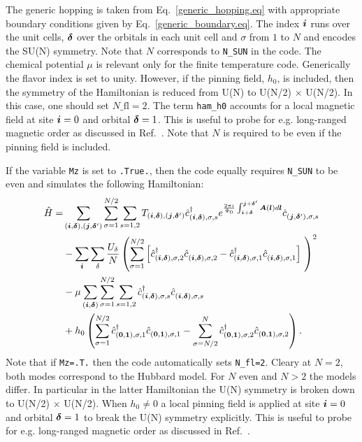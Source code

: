 The generic hopping is taken from Eq.~\eqref{generic_hopping.eq}   with appropriate boundary conditions given by Eq.~\eqref{generic_boundary.eq}.  The index $\boldsymbol{i}$ runs over the unit cells, $\boldsymbol{\delta}$ over the orbitals in each unit cell and $\sigma$  from $1$ to $N$  and encodes the SU(N) symmetry.    Note that  $N$ corresponds to \texttt{N\_SUN}  in the code.  The chemical potential $\mu$ is relevant only for the finite temperature code. Generically the flavor index is set to  unity.  However, if the pinning field, $h_0$, is  included, then the symmetry of the Hamiltonian is reduced from U(N) to U(N/2) $\times$ U(N/2). In this case, one 
should set $N\_{\mathrm{fl}}=2$. 
The term \texttt{ham\_h0}  accounts for a  local magnetic field at site $\boldsymbol{i}=0$ and orbital $\boldsymbol{\delta}=1$.
This is useful to probe for e.g. long-ranged magnetic order as discussed in Ref.~\cite{Assaad13}.  Note that $N$ is required to be even if the pinning field is included. 


If the variable \texttt{Mz} is set to \texttt{.True.}, then the code equally requires  \texttt{N\_SUN}  to be even and simulates the following Hamiltonian: 
\begin{align}
\hat{H} =& \sum_{(\ve{i},\ve{\delta}), (\ve{j},\ve{\delta}')}  \sum_{\sigma =1}^{N/2}  \sum_{s=1,2} T_{(\ve{i},\ve{\delta}), (\ve{j},\ve{\delta}')}    \hat{c}^{\dagger}_{(\ve{i},\ve{\delta}), \sigma,s }   e^{\frac{2 \pi i}{\Phi_0} \int_{\ve{i} + \ve{\delta}}^{\ve{j} + \ve{\delta}'}  
     \vec{A}(\ve{l})  d \ve{l}} \hat{c}^{}_{(\ve{j},\ve{\delta}'),\sigma,s}     \nonumber   \\
    &- \sum_{\vec{i}} \sum_{\delta}   \frac{U_\delta}{N} \left(\sum_{\sigma=1}^{N/2}  \left[   \hat{c}^{\dagger}_{(\vec{i},\ve{\delta}),\sigma, 2} 
    \hat{c}^{\phantom\dagger}_{(\vec{i}, \ve{\delta}),\sigma,2 }  -  \hat{c}^{\dagger}_{(\vec{i},\ve{\delta}),\sigma, 1} 
    \hat{c}^{\phantom\dagger}_{(\vec{i}, \ve{\delta}),\sigma,1} \right] \right)^2  \nonumber \\
    & - \mu \sum_{(\ve{i},\ve{\delta})}  \sum_{\sigma =1}^{N/2}  \sum_{s=1,2}\hat{c}^{\dagger}_{(\vec{i},\ve{\delta}),\sigma, s} \hat{c}^{\phantom\dagger}_{(\vec{i},\ve{\delta}),\sigma, s} \nonumber \\
    &  + h_0 \left(\sum_{\sigma=1}^{N/2} \hat{c}^{\dagger}_{(\vec{0},\ve{1}),\sigma, 1}  \hat{c}^{}_{(\vec{0},\ve{1}),\sigma, 1}  -  \sum_{\sigma=N/2}^{N} \hat{c}^{\dagger}_{(\vec{0},\ve{1}),\sigma, 2}  \hat{c}^{}_{(\vec{0},\ve{1}),\sigma, 2} \right) .
\end{align}
Note that if \texttt{Mz=.T.} then the code automatically sets  \texttt{N\_fl=2}. Cleary at $N=2$, both modes  correspond  to the Hubbard model.  For $N$  even and $N > 2$  the models differ.  In particular  in the latter  Hamiltonian the U(N) symmetry is broken down to  U(N/2) $\times$ U(N/2).  When $h_0 \neq 0$  a local pinning field is applied at site $\boldsymbol{i}=0$ and orbital $\boldsymbol{\delta}=1$  to break the U(N) symmetry explicitly.   This is useful to probe for e.g. long-ranged magnetic order as discussed in Ref.~\cite{Assaad13}.


